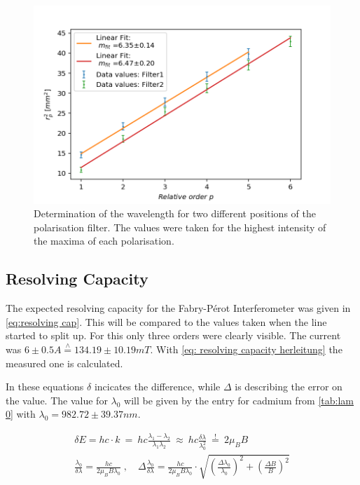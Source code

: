 \documentclass[]{article}
\begin{document}
\begin{figure}[H]
\centering
\includegraphics[width=1\textwidth]{Plots/Both_Filters.png}
\caption{Determination of the wavelength for two different positions of the polarisation filter. The values were taken for the highest intensity of the maxima of each polarisation.}
\label{fig: lambda sigma pm}
\end{figure}


\subsection{Resolving Capacity}
The expected resolving capacity for the Fabry-Pérot Interferometer was given in \autoref{eq:resolving cap}. This will be compared to the values taken when the line started to split up. For this only three orders were clearly visible. The current was $6\pm 0.5 A \overset{\land}{=} 134.19 \pm 10.19 mT$. 
With \autoref{eq: resolving capacity herleitung} the measured one is calculated.

In these equations $\delta$ incicates the difference, while $\Delta$ is describing the error on the value. The value for $\lambda_0$ will be given by the entry for cadmium from \autoref{tab:lam 0} with $\lambda_0 = 982.72\pm39.37 nm$.

\begin{align}
\delta E= hc \cdot k\ =\ hc \frac{\lambda_1-\lambda_2}{\lambda_1\lambda_2}\ \approx\ hc\frac{\delta \lambda}{\lambda_0^2}\ \overset{!}{=}\ 2\mu_B B 
\label{eq: delta E gleich}
\\
\frac{\lambda_0}{\delta \lambda} = \frac{hc}{2\mu_B B \lambda_0} \;,\quad \Delta \frac{\lambda_0}{\delta \lambda} = \frac{hc}{2\mu_B B \lambda_0} \cdot \sqrt{\left(\frac{\Delta \lambda_0}{\lambda_0}\right)^2 + \left(\frac{\Delta B}{B}\right)^2}
\label{eq: resolving capacity herleitung}
\end{align}
\end{document}

